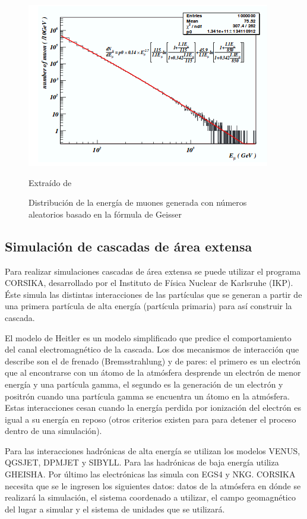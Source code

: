 \documentclass{book}
\begin{document}
\begin{figure}[ht] %
\begin{center}
 \includegraphics[width = 0.7\linewidth]{GeisserMuon.png}
 
 Extra\'ido de \citep{GUAN}
\caption{Distribuci\'on de la energ\'ia de muones generada con n\'umeros aleatorios basado en la f\'ormula de Geisser}
\end{center}
\end{figure}

\subsection{Simulaci\'on de cascadas de \'area extensa}
Para realizar simulaciones cascadas de \'area extensa se puede utilizar el programa CORSIKA, desarrollado por el Instituto de F\'isica Nuclear de Karlsruhe (IKP). \'Este simula las distintas interacciones de las part\'iculas que se generan a partir de una primera part\'icula de alta energ\'ia (part\'icula primaria) para as\'i construir la cascada. \citep{HECK}

El modelo de Heitler es un modelo simplificado que predice el comportamiento del canal electromagn\'etico de la cascada. Los dos mecanismos de interacci\'on que describe son el de frenado (Bremsstrahlung) y de pares: el primero es un electr\'on que al encontrarse con un \'atomo de la atm\'osfera desprende un electr\'on de menor energ\'ia y una part\'icula gamma, el segundo es la generaci\'on de un electr\'on y positr\'on cuando una part\'icula gamma se encuentra un \'atomo en la atm\'osfera. Estas interacciones cesan cuando la energ\'ia perdida por ionizaci\'on del electr\'on es igual a su energ\'ia en reposo (otros criterios existen para para detener el proceso dentro de una simulaci\'on). \citep{SUAREZ}

Para las interacciones hadr\'onicas de alta energ\'ia se utilizan los modelos VENUS, QGSJET, DPMJET y SIBYLL. Para las hadr\'onicas de baja energ\'ia utiliza GHEISHA. Por \'ultimo las electr\'onicas las simula con EGS4 y NKG. CORSIKA necesita que se le ingresen los siguientes datos: datos de la atm\'osfera en d\'onde se realizar\'a la simulaci\'on, el sistema coordenado a utilizar, el campo geomagn\'etico del lugar a simular y el sistema de unidades que se utilizar\'a. \citep{HECK}
\end{document}
